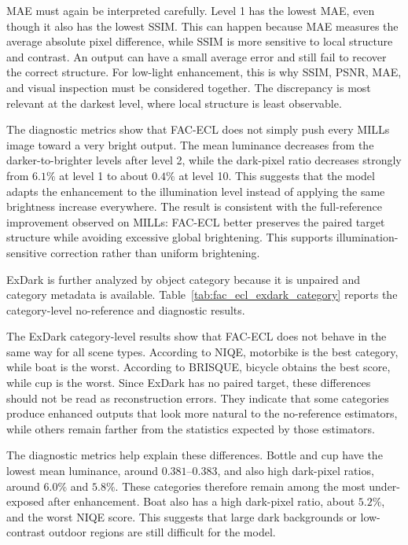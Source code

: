 MAE must again be interpreted carefully. Level 1 has the lowest MAE, even though it also has the lowest SSIM. This can happen because MAE measures the average absolute pixel difference, while SSIM is more sensitive to local structure and contrast. An output can have a small average error and still fail to recover the correct structure. For low-light enhancement, this is why SSIM, PSNR, MAE, and visual inspection must be considered together. The discrepancy is most relevant at the darkest level, where local structure is least observable.

The diagnostic metrics show that FAC-ECL does not simply push every MILLs image toward a very bright output. The mean luminance decreases from the darker-to-brighter levels after level 2, while the dark-pixel ratio decreases strongly from $6.1\%$ at level 1 to about $0.4\%$ at level 10. This suggests that the model adapts the enhancement to the illumination level instead of applying the same brightness increase everywhere. The result is consistent with the full-reference improvement observed on MILLs: FAC-ECL better preserves the paired target structure while avoiding excessive global brightening. This supports illumination-sensitive correction rather than uniform brightening.

ExDark is further analyzed by object category because it is unpaired and category metadata is available. Table~\ref{tab:fac_ecl_exdark_category} reports the category-level no-reference and diagnostic results.



The ExDark category-level results show that FAC-ECL does not behave in the same way for all scene types. According to NIQE, motorbike is the best category, while boat is the worst. According to BRISQUE, bicycle obtains the best score, while cup is the worst. Since ExDark has no paired target, these differences should not be read as reconstruction errors. They indicate that some categories produce enhanced outputs that look more natural to the no-reference estimators, while others remain farther from the statistics expected by those estimators.

The diagnostic metrics help explain these differences. Bottle and cup have the lowest mean luminance, around $0.381$--$0.383$, and also high dark-pixel ratios, around $6.0\%$ and $5.8\%$. These categories therefore remain among the most under-exposed after enhancement. Boat also has a high dark-pixel ratio, about $5.2\%$, and the worst NIQE score. This suggests that large dark backgrounds or low-contrast outdoor regions are still difficult for the model.

